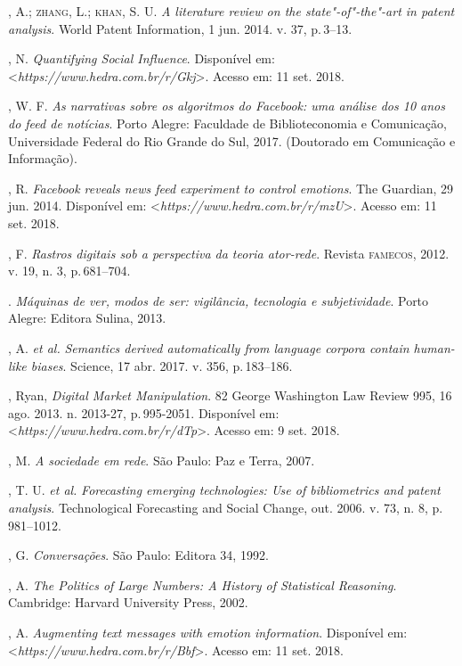 \begin{bibliohedra}
, A.; \textsc{zhang}, L.; \textsc{khan}, S. U. \emph{A literature review on the
state"-of"-the"-art in patent analysis}. World Patent Information, 1 jun.
2014. v. 37, p.\,3--13.

, N. \emph{Quantifying Social Influence}. Disponível em:
\textless{}\emph{https://www.hedra.com.br/r/Gkj}\textgreater{}. Acesso em: 11 set. 2018.

, W. F. \emph{As narrativas sobre os algoritmos do Facebook: uma
análise dos 10 anos do feed de notícias}. Porto Alegre: Faculdade de
Biblioteconomia e Comunicação, Universidade Federal do Rio Grande do
Sul, 2017. (Doutorado em Comunicação e Informação).

, R. \emph{Facebook reveals news feed experiment to control
emotions}. The Guardian, 29 jun. 2014. Disponível em:
\textless{}\emph{https://www.hedra.com.br/r/mzU}\textgreater{}. Acesso em: 11 set. 2018.

, F. \emph{Rastros digitais sob a perspectiva da teoria
ator-rede}. Revista \textsc{famecos}, 2012. v. 19, n. 3, p.\,681--704.

\titidem. \emph{Máquinas de ver, modos de ser: vigilância,
tecnologia e subjetividade}. Porto Alegre: Editora Sulina, 2013.

, A. \emph{et al.} \emph{Semantics derived automatically from
language corpora contain human-like biases}. Science, 17 abr. 2017. v.
356, p.\,183--186.

, Ryan, \emph{Digital Market Manipulation}. 82 George Washington
Law Review 995, 16 ago. 2013. n. 2013-27, p.\,995-2051. Disponível em:
\textless{}\emph{https://www.hedra.com.br/r/dTp}\textgreater{}. Acesso em: 9 set. 2018.

, M. \emph{A sociedade em rede}. São Paulo: Paz e Terra, 2007.

, T. U. \emph{et al.} \emph{Forecasting emerging technologies: Use
of bibliometrics and patent analysis}. Technological Forecasting and
Social Change, out. 2006. v. 73, n. 8, p.\,981--1012.

, G. \emph{Conversações}. São Paulo: Editora 34, 1992.

, A. \emph{The Politics of Large Numbers: A History of
Statistical Reasoning}. Cambridge: Harvard University Press, 2002.

, A. \emph{Augmenting text messages with emotion information}.
Disponível em: \textless{}\emph{https://www.hedra.com.br/r/Bbf}\textgreater{}. Acesso em: 11 set. 2018.


\end{bibliohedra}
